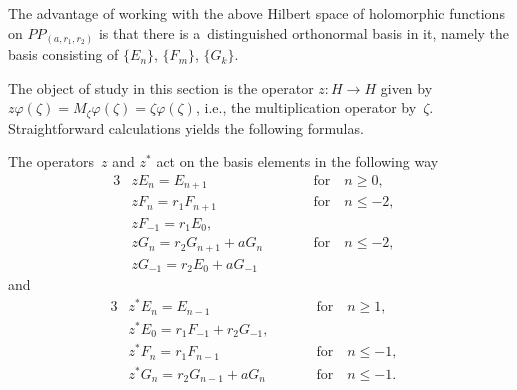 The advantage of working with the above Hilbert space of holomorphic functions on $PP_{(a, r_1,r_2)}$ is that there is
a~distinguished orthonormal basis in it, namely the basis consisting of $\{E_n\}$, $\{F_m\}$, $\{G_k\}$.

The object of study in this section is the operator $z:H \to H$ given by $z\varphi(\zeta)=M_\zeta \varphi(\zeta) =
\zeta \varphi(\zeta)$, i.e., the multiplication operator by~$\zeta$.
Straightforward calculations yields the following formulas.

\begin{Lemma}
The operators~$z$ and $z^*$ act on the basis elements in the following way
\begin{alignat*}{3}
& zE_n=E_{n+1} \qquad && \text{for} \quad n\ge 0,&
\\
& zF_n=r_1F_{n+1} \qquad && \text{for} \quad n\le -2, &
\\
& zF_{-1}=r_1E_0,&&&
\\
& zG_n=r_2G_{n+1}+aG_n \qquad && \text{for} \quad  n\le -2, &
\\
& zG_{-1}=r_2E_0+aG_{-1}&&&
\end{alignat*}
and
\begin{alignat*}{3}
& z^*E_n=E_{n-1} \qquad && \text{for} \quad  n\ge 1,&
\\
& z^*E_0=r_1F_{-1}+r_2G_{-1}, &&&
\\
& z^*F_n=r_1F_{n-1} \qquad && \text{for} \quad n\le -1,&
\\
& z^*G_n=r_2G_{n-1}+aG_n \qquad && \text{for} \quad n\le -1. &
\end{alignat*}
\end{Lemma}

